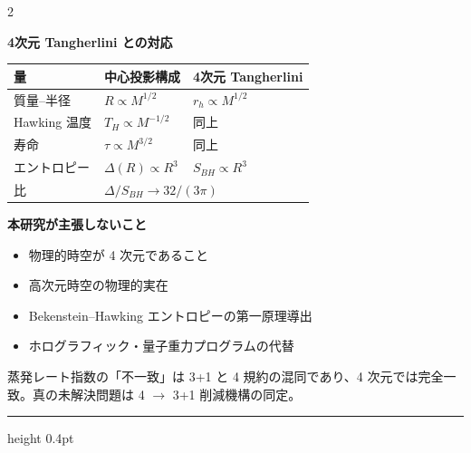 \documentclass[9pt,a4paper]{ltjsarticle}
\begin{document}
\begin{multicols}{2}
\columnbreak

\textbf{4次元 Tangherlini との対応}

\vspace{1pt}
\begin{center}
\footnotesize
\begin{tabular}{@{}lll@{}}
\toprule
量 & 中心投影構成 & 4次元 Tangherlini \\
\midrule
質量--半径 & $R \propto M^{1/2}$ & $r_h \propto M^{1/2}$ \\
Hawking 温度 & $T_H \propto M^{-1/2}$ & 同上 \\
寿命 & $\tau \propto M^{3/2}$ & 同上 \\
エントロピー & $\Delta(R) \propto R^3$ & $S_{BH} \propto R^3$ \\
比 & \multicolumn{2}{l}{$\Delta/S_{BH} \to 32/(3\pi)$} \\
\bottomrule
\end{tabular}
\end{center}

\vspace{6pt}
\textbf{本研究が主張しないこと}

\vspace{1pt}
\begin{itemize}[topsep=1pt]
\item 物理的時空が 4 次元であること
\item 高次元時空の物理的実在
\item Bekenstein--Hawking エントロピーの第一原理導出
\item ホログラフィック・量子重力プログラムの代替
\end{itemize}

\vspace{1pt}
{\footnotesize 蒸発レート指数の「不一致」は 3+1 と 4 規約の混同であり、4 次元では完全一致。真の未解決問題は 4 $\to$ 3+1 削減機構の同定。}

\end{multicols}

\vspace{0pt}
\hrule height 0.4pt
\vspace{3pt}
\end{document}
